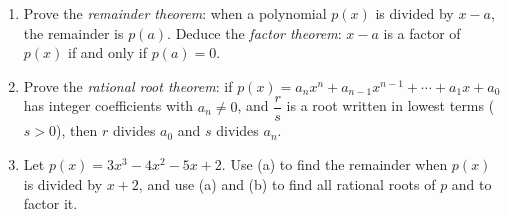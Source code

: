 \begin{enumerate}
\item[(a)] Prove the \emph{remainder theorem}: when a polynomial $p(x)$ is divided by $x-a$, the remainder is $p(a)$. Deduce the \emph{factor theorem}: $x-a$ is a factor of $p(x)$ if and only if $p(a)=0$.
\item[(b)] Prove the \emph{rational root theorem}: if $p(x)=a_nx^n+a_{n-1}x^{n-1}+\cdots+a_1x+a_0$ has integer coefficients with $a_n\ne0$, and $\dfrac {r}{s}$ is a root written in lowest terms ($s>0$), then $r$ divides $a_0$ and $s$ divides $a_n$.
\item[(c)] Let $p(x)=3x^3-4x^2-5x+2$. Use (a) to find the remainder when $p(x)$ is divided by $x+2$, and use (a) and (b) to find all rational roots of $p$ and to factor it.
\end{enumerate}
